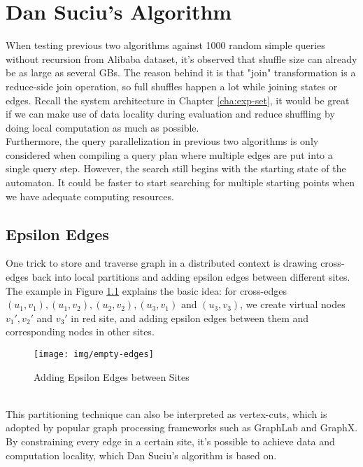 \chapter{\label{cha:dan-alg}Dan Suciu's Algorithm}
When testing previous two algorithms against 1000 random simple queries without recursion from Alibaba dataset, it's observed that shuffle size can already be as large as several GBs. The reason behind it is that "join" transformation is a reduce-side join operation, so full shuffles happen a lot while joining states or edges. Recall the system architecture in Chapter \ref{cha:exp-set}, it would be great if we can make use of data locality during evaluation and reduce shuffling by doing local computation as much as possible.\\
Furthermore, the query parallelization in previous two algorithms is only considered when compiling a query plan where multiple edges are put into a single query step. However, the search still begins with the starting state of the automaton. It could be faster to start searching for multiple starting points when we have adequate computing resources.
\section{Epsilon Edges}
One trick to store and traverse graph in a distributed context is drawing cross-edges back into local partitions and adding epsilon edges between different sites. The example in Figure \ref{fig:empty-edges} explains the basic idea: for cross-edges $(u_1,v_1), (u_1,v_2), (u_2,v_2), (u_3,v_1)$ and $(u_3,v_3)$, we create virtual nodes $v_1', v_2'$ and $v_3'$ in red site, and adding epsilon edges between them and corresponding nodes in other sites.
\begin{figure}[h!]
  \caption{Adding Epsilon Edges between Sites}
  \label{fig:empty-edges}
  \centering
    \texttt{[image: img/empty-edges]}
\end{figure}
\\This partitioning technique can also be interpreted as vertex-cuts, which is adopted by popular graph processing frameworks such as GraphLab\cite{low2012distributed} and GraphX\cite{xin2013graphx}. By constraining every edge in a certain site, it's possible to achieve data and computation locality, which Dan Suciu's algorithm is based on.
